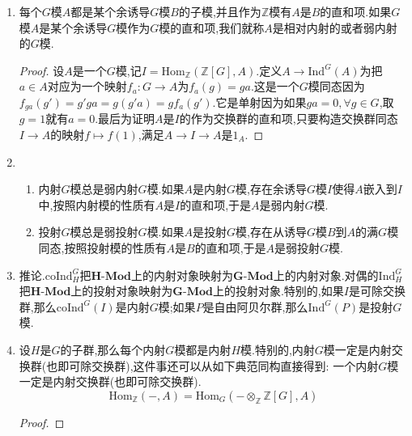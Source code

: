 \begin{enumerate}
\begin{proof}
		如果把$A$作为阿贝尔群记作$A_0$,考虑$\pi:\mathbb{Z}[G]\otimes_{\mathbb{Z}}A_0\to A$为$g\otimes a\mapsto ga$,这是满同态.于是$A$是诱导$G$模$\mathbb{Z}[G]\otimes_{\mathbb{Z}}A_0$的商.作为$\mathbb{Z}$模是直和项是因为有阿贝尔群同态$\varphi:A\to\mathbb{Z}[G]\otimes_{\mathbb{Z}}A_0$为$a\mapsto 1\otimes a$,使得$\pi\circ\varphi=1_A$.
	\end{proof}
	\item 每个$G$模$A$都是某个余诱导$G$模$B$的子模,并且作为$\mathbb{Z}$模有$A$是$B$的直和项.如果$G$模$A$是某个余诱导$G$模作为$G$模的直和项,我们就称$A$是相对内射的或者弱内射的$G$模.
	\begin{proof}
		
		设$A$是一个$G$模,记$I=\mathrm{Hom}_{\mathbb{Z}}(\mathbb{Z}[G],A)$.定义$A\to\mathrm{Ind}^G(A)$为把$a\in A$对应为一个映射$f_a:G\to A$为$f_a(g)=ga$.这是一个$G$模同态因为$f_{ga}(g')=g'ga=g(g'a)=gf_a(g')$.它是单射因为如果$ga=0,\forall g\in G$,取$g=1$就有$a=0$.最后为证明$A$是$I$的作为交换群的直和项,只要构造交换群同态$I\to A$的映射$f\mapsto f(1)$,满足$A\to I\to A$是$1_A$.
	\end{proof}
	\item 
	\begin{enumerate}[(1)]
		\item 内射$G$模总是弱内射$G$模.如果$A$是内射$G$模,存在余诱导$G$模$I$使得$A$嵌入到$I$中,按照内射模的性质有$A$是$I$的直和项,于是$A$是弱内射$G$模.
		\item 投射$G$模总是弱投射$G$模.如果$A$是投射$G$模,存在从诱导$G$模$B$到$A$的满$G$模同态,按照投射模的性质有$A$是$B$的直和项,于是$A$是弱投射$G$模.
	\end{enumerate}
	\item 推论.$\mathrm{coInd}_H^G$把$\textbf{H-Mod}$上的内射对象映射为$\textbf{G-Mod}$上的内射对象.对偶的$\mathrm{Ind}_H^G$把$\textbf{H-Mod}$上的投射对象映射为$\textbf{G-Mod}$上的投射对象.特别的,如果$I$是可除交换群,那么$\mathrm{coInd}^G(I)$是内射$G$模;如果$P$是自由阿贝尔群,那么$\mathrm{Ind}^G(P)$是投射$G$模.
	\item 设$H$是$G$的子群,那么每个内射$G$模都是内射$H$模.特别的,内射$G$模一定是内射交换群(也即可除交换群),这件事还可以从如下典范同构直接得到:
	一个内射$G$模一定是内射交换群(也即可除交换群).
	$$\mathrm{Hom}_{\mathbb{Z}}(-,A)=\mathrm{Hom}_G(-\otimes_{\mathbb{Z}}\mathbb{Z}[G],A)$$
	\begin{proof}
		

\end{proof}
\end{enumerate}
